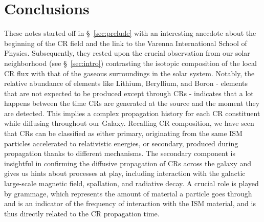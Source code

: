 \section{Conclusions}
\label{sec:conclusions}
These notes started off in \S~\ref{sec:prelude} with an interesting anecdote about the beginning of the CR field and the link to the Varenna International School of Physics. Subsequently, they rested upon the crucial observation from our solar neighborhood (see \S~\ref{sec:intro}) contrasting the isotopic composition of the local CR flux with that of the gaseous surroundings in the solar system. Notably, the relative abundance of elements like Lithium, Beryllium, and Boron - elements that are not expected to be produced except through CRs - indicates that a lot happens between the time CRs are generated at the source and the moment they are detected. This implies a complex propagation history for each CR constituent while diffusing throughout our Galaxy. Recalling CR composition, we have seen that CRs can be classified as either primary, originating from the same ISM particles accelerated to relativistic energies, or secondary, produced during propagation thanks to different mechanisms. The secondary component is insightful in confirming the diffusive propagation of CRs across the galaxy and gives us hints about processes at play, including interaction with the galactic large-scale magnetic field, spallation, and radiative decay. A crucial role is played by grammage, which represents the amount of material a particle goes through and is an indicator of the frequency of interaction with the ISM material, and is thus directly related to the CR propagation time.


